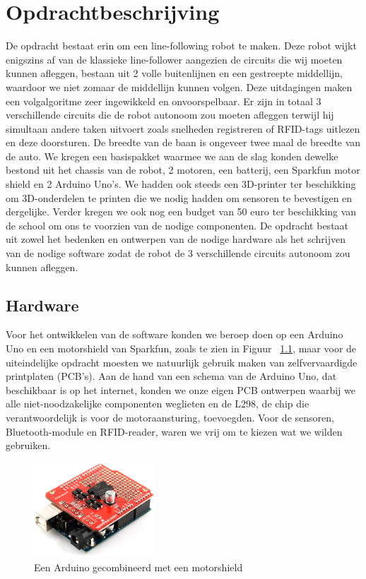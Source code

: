\chapter{Opdrachtbeschrijving}
\label{chap:Opdrachtbeschrijving}
De opdracht bestaat erin om een line-following robot te maken. Deze robot wijkt enigszins af van de klassieke line-follower aangezien de circuits die wij moeten kunnen afleggen, bestaan uit 2 volle buitenlijnen en een gestreepte middellijn, waardoor we niet zomaar de middellijn kunnen volgen. Deze uitdagingen maken een volgalgoritme zeer ingewikkeld en onvoorspelbaar. Er zijn in totaal 3 verschillende circuits die de robot autonoom zou moeten afleggen terwijl hij simultaan andere taken uitvoert zoals snelheden registreren of RFID-tags uitlezen en deze doorsturen. De breedte van de baan is ongeveer twee maal de breedte van de auto. We kregen een basispakket waarmee we aan de slag konden dewelke bestond uit het chassis van de robot, 2 motoren, een batterij, een Sparkfun motor shield en 2 Arduino Uno's. We hadden ook steeds een 3D-printer ter beschikking om 3D-onderdelen te printen die we nodig hadden om sensoren te bevestigen en dergelijke. Verder kregen we ook nog een budget van 50 euro ter beschikking van de school om ons te voorzien van de nodige componenten. De opdracht bestaat uit zowel het bedenken en ontwerpen van de nodige hardware als het schrijven van de nodige software zodat de robot de 3 verschillende circuits autonoom zou kunnen afleggen.
\section{Hardware}
Voor het ontwikkelen van de software konden we beroep doen op een Arduino Uno en een motorshield van Sparkfun, zoals te zien in Figuur ~\ref{fig:ArduMoto}, maar voor de uiteindelijke opdracht moesten we natuurlijk gebruik maken van zelfvervaardigde printplaten (PCB's). Aan de hand van een schema van de Arduino Uno, dat beschikbaar is op het internet, konden we onze eigen PCB ontwerpen waarbij we alle niet-noodzakelijke componenten weglieten en de L298, de chip die verantwoordelijk is voor de motoraansturing, toevoegden. Voor de sensoren, Bluetooth-module en RFID-reader, waren we vrij om te kiezen wat we wilden gebruiken.




\begin{figure}[H]
\centering
\includegraphics[width=0.4\textwidth]{ArduMoto.png}
\caption{Een Arduino gecombineerd met een motorshield \label{fig:ArduMoto}}
\end{figure}

